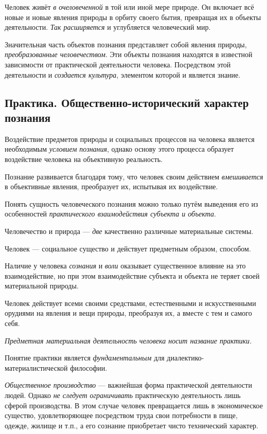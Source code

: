 \documentclass[a4paper,14pt,russian]{extreport}
\begin{document}
Человек живёт \emph{в очеловеченной} в той или иной мере природе. Он включает всё новые и новые явления природы в орбиту своего бытия, превращая их в объекты деятельности. \emph{Так расширяется} и углубляется человеческий мир.

Значительная часть объектов познания представляет собой явления природы, \emph{преобразованные человечеством}. Эти объекты познания находятся в известной зависимости от практической деятельности человека. Посредством этой деятельности и \emph{создается культура}, элементом которой и является знание.

\subsection{Практика. Общественно-исторический характер познания}

Воздействие предметов природы и социальных процессов на человека является необходимым \emph{условием познания}, однако основу этого процесса образует воздействие человека на объективную реальность.

Познание развивается благодаря тому, что человек своим действием \emph{вмешивается} в объективные явления, преобразует их, испытывая их воздействие.

Понять сущность человеческого познания можно только путём выведения его из особенностей \emph{практического взаимодействия субъекта и объекта}.

Человечество и природа --- \emph{две} качественно различные материальные системы.

Человек --- социальное существо и действует предметным образом, способом.

Наличие у человека \emph{сознания} и \emph{воли} оказывает существенное влияние на это взаимодействие, но при этом взаимодействие субъекта и объекта не теряет своей материальной природы.

Человек действует всеми своими средствами, естественными и искусственными орудиями на явления и вещи природы, преобразуя их, а вместе с тем и самого себя.

\emph{Предметная материальная деятельность человека носит название практики.}

Понятие практики является \emph{фундаментальным} для диалектико-материалистической философии.

\emph{Общественное производство} --- важнейшая форма практической деятельности людей. Однако \emph{не следует ограничивать} практическую деятельность лишь сферой производства. В этом случае человек превращается лишь в экономическое существо, удовлетворяющее посредством труда свои потребности в пище, одежде, жилище и т.п., а его сознание приобретает чисто технический характер.
\end{document}
